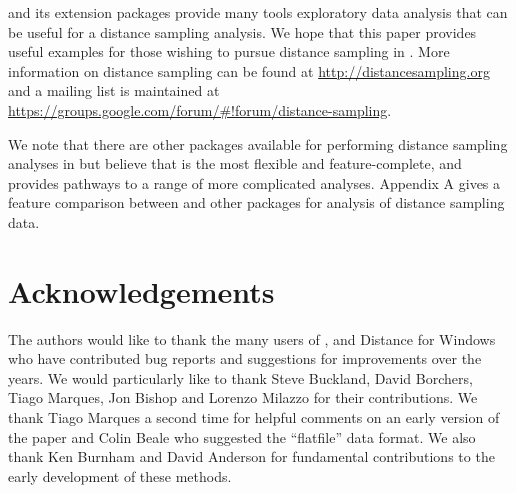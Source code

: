 \documentclass[article]{jss}
\begin{document}
 and its extension packages provide many tools exploratory
data analysis that can be useful for a distance sampling analysis. We
hope that this paper provides useful examples for those wishing to
pursue distance sampling in . More information on distance
sampling can be found at \url{http://distancesampling.org} and a mailing
list is maintained at
\url{https://groups.google.com/forum/#!forum/distance-sampling}.

We note that there are other packages available for performing distance
sampling analyses in  but believe that  is the
most flexible and feature-complete, and provides pathways to a range of
more complicated analyses. Appendix A gives a feature comparison between
 and other  packages for analysis of distance
sampling data.

\section{Acknowledgements}\label{acknowledgements}

The authors would like to thank the many users of ,
 and Distance for Windows who have contributed bug reports and
suggestions for improvements over the years. We would particularly like
to thank Steve Buckland, David Borchers, Tiago Marques, Jon Bishop and
Lorenzo Milazzo for their contributions. We thank Tiago Marques a second
time for helpful comments on an early version of the paper and Colin
Beale who suggested the ``flatfile'' data format. We also thank Ken
Burnham and David Anderson for fundamental contributions to the early
development of these methods.

\renewcommand\refname{Bibliography}

\end{document}
